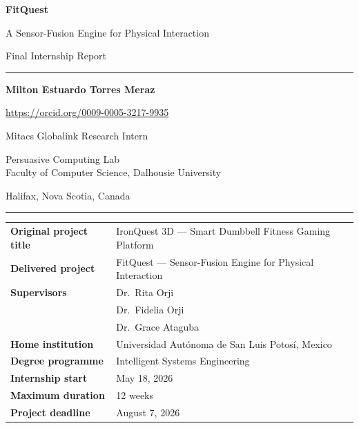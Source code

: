 \documentclass[11pt,a4paper]{article}
\begin{document}

\begin{titlepage}
\hypersetup{pageanchor=false}
\centering
\vspace*{2cm}

{\Huge\bfseries FitQuest\par}
\vspace{0.4cm}
{\LARGE A Sensor-Fusion Engine for Physical Interaction\par}

\vspace{0.8cm}
{\large Final Internship Report\par}

\vspace{1.5cm}
\rule{\textwidth}{0.5pt}
\vspace{0.6cm}

{\large\bfseries Milton Estuardo Torres Meraz\par}
\vspace{0.15cm}
{\normalsize\url{https://orcid.org/0009-0005-3217-9935}\par}
\vspace{0.3cm}
{\large Mitacs Globalink Research Intern\par}
\vspace{0.2cm}
{\large Persuasive Computing Lab\\Faculty of Computer Science, Dalhousie University\par}
\vspace{0.2cm}
{\large Halifax, Nova Scotia, Canada\par}

\vspace{0.8cm}
\rule{\textwidth}{0.5pt}

\vspace{1.2cm}
\begin{tabular}{@{}ll@{}}
\textbf{Original project title} & IronQuest 3D --- Smart Dumbbell Fitness Gaming Platform \\[2pt]
\textbf{Delivered project} & FitQuest --- Sensor-Fusion Engine for Physical Interaction \\[2pt]
\textbf{Supervisors} & Dr.\ Rita Orji \\
                     & Dr.\ Fidelia Orji \\
                     & Dr.\ Grace Ataguba \\[2pt]
\textbf{Home institution} & Universidad Autónoma de San Luis Potosí, Mexico \\[2pt]
\textbf{Degree programme} & Intelligent Systems Engineering \\[2pt]
\textbf{Internship start} & May 18, 2026 \\[2pt]
\textbf{Maximum duration} & 12 weeks \\[2pt]
\textbf{Project deadline} & August 7, 2026 \\
\end{tabular}


\end{titlepage}
\end{document}
